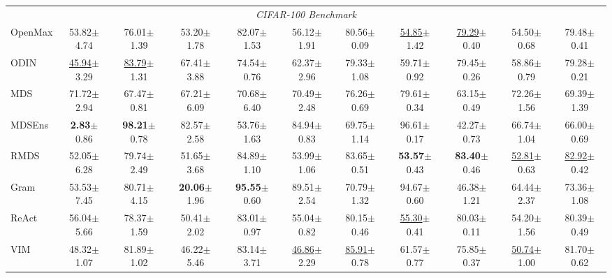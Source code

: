\documentclass{article} \usepackage{iclr2024_conference,times}
\begin{document}
\begin{table*}
{\begin{tabular}{l cc cc cc cc cc}
			\multicolumn{11}{c}{\emph{CIFAR-100 Benchmark}} \\
OpenMax & 53.82{\tiny$\pm$4.74} &  76.01{\tiny$\pm$1.39} &  53.20{\tiny$\pm$1.78} &  82.07{\tiny$\pm$1.53} &  56.12{\tiny$\pm$1.91} &  80.56{\tiny$\pm$0.09} &  \underline{54.85}{\tiny$\pm$1.42} &  \underline{79.29}{\tiny$\pm$0.40} &  54.50{\tiny$\pm$0.68} &  79.48{\tiny$\pm$0.41 }\\ 
ODIN & \underline{45.94}{\tiny$\pm$3.29} &  \underline{83.79}{\tiny$\pm$1.31} &  67.41{\tiny$\pm$3.88} &  74.54{\tiny$\pm$0.76} &  62.37{\tiny$\pm$2.96} &  79.33{\tiny$\pm$1.08} &  59.71{\tiny$\pm$0.92} &  79.45{\tiny$\pm$0.26} &  58.86{\tiny$\pm$0.79} &  79.28{\tiny$\pm$0.21 }\\ 
			MDS & 71.72{\tiny$\pm$2.94} &  67.47{\tiny$\pm$0.81} &  67.21{\tiny$\pm$6.09} &  70.68{\tiny$\pm$6.40} &  70.49{\tiny$\pm$2.48} &  76.26{\tiny$\pm$0.69} &  79.61{\tiny$\pm$0.34} &  63.15{\tiny$\pm$0.49} &  72.26{\tiny$\pm$1.56} &  69.39{\tiny$\pm$1.39 }\\ 
			MDSEns & \textbf{2.83}{\tiny$\pm$0.86} &  \textbf{98.21}{\tiny$\pm$0.78} &  82.57{\tiny$\pm$2.58} &  53.76{\tiny$\pm$1.63} &  84.94{\tiny$\pm$0.83} &  69.75{\tiny$\pm$1.14} &  96.61{\tiny$\pm$0.17} &  42.27{\tiny$\pm$0.73} &  66.74{\tiny$\pm$1.04} &  66.00{\tiny$\pm$0.69 }\\ 
			RMDS & 52.05{\tiny$\pm$6.28} &  79.74{\tiny$\pm$2.49} &  51.65{\tiny$\pm$3.68} &  84.89{\tiny$\pm$1.10} &  53.99{\tiny$\pm$1.06} &  83.65{\tiny$\pm$0.51} &  \textbf{53.57}{\tiny$\pm$0.43} &  \textbf{83.40}{\tiny$\pm$0.46} &  \underline{52.81}{\tiny$\pm$0.63} &  \underline{82.92}{\tiny$\pm$0.42 }\\ 
			Gram & 53.53{\tiny$\pm$7.45} &  80.71{\tiny$\pm$4.15} &  \textbf{20.06}{\tiny$\pm$1.96} &  \textbf{95.55}{\tiny$\pm$0.60} &  89.51{\tiny$\pm$2.54} &  70.79{\tiny$\pm$1.32} &  94.67{\tiny$\pm$0.60} &  46.38{\tiny$\pm$1.21} &  64.44{\tiny$\pm$2.37} &  73.36{\tiny$\pm$1.08 }\\ 
ReAct & 56.04{\tiny$\pm$5.66} &  78.37{\tiny$\pm$1.59} &  50.41{\tiny$\pm$2.02} &  83.01{\tiny$\pm$0.97} &  55.04{\tiny$\pm$0.82} &  80.15{\tiny$\pm$0.46} &  \underline{55.30}{\tiny$\pm$0.41} &  80.03{\tiny$\pm$0.11} &  54.20{\tiny$\pm$1.56} &  80.39{\tiny$\pm$0.49 }\\ 
VIM & 48.32{\tiny$\pm$1.07} &  81.89{\tiny$\pm$1.02} &  46.22{\tiny$\pm$5.46} &  83.14{\tiny$\pm$3.71} &  \underline{46.86}{\tiny$\pm$2.29} &  \underline{85.91}{\tiny$\pm$0.78} &  61.57{\tiny$\pm$0.77} &  75.85{\tiny$\pm$0.37} &  \underline{50.74}{\tiny$\pm$1.00} &  81.70{\tiny$\pm$0.62 }\\ 

\end{tabular}}
\end{table*}
\end{document}
